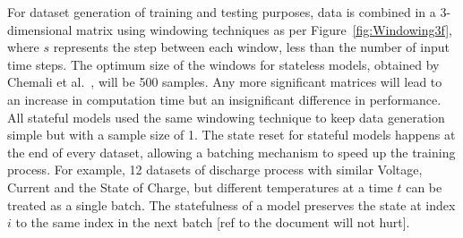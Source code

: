 %
%
For dataset generation of training and testing purposes, data is combined in a 3-dimensional matrix using windowing techniques as per Figure~\ref{fig:Windowing3f}, where $s$ represents the step between each window, less than the number of input time steps.
The optimum size of the windows for stateless models, obtained by Chemali et al.~\cite{Chemali2017}, will be 500 samples.
Any more significant matrices will lead to an increase in computation time but an insignificant difference in performance.
All stateful models used the same windowing technique to keep data generation simple but with a sample size of 1.
The state reset for stateful models happens at the end of every dataset, allowing a batching mechanism to speed up the training process.
For example, 12 datasets of discharge process with similar Voltage, Current and the State of Charge, but different temperatures at a time $t$ can be treated as a single batch.
The statefulness of a model preserves the state at index $i$ to the same index in the next batch [ref to the document will not hurt].

